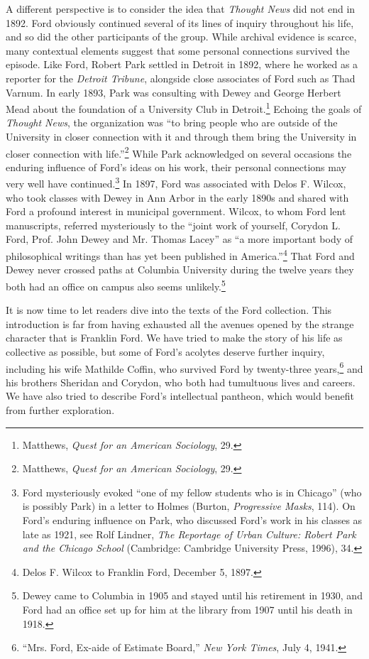 \documentclass[twoside,symmetric,nobib,justified]{tufte-book}
\begin{document}
\enlargethispage{\baselineskip}

A different perspective is to consider the idea that \emph{Thought News}
did not end in 1892. Ford obviously continued several of its lines of
inquiry throughout his life, and so did the other participants of the
group. While archival evidence is scarce, many contextual elements
suggest that some personal connections survived the episode. Like Ford,
Robert Park settled in Detroit in 1892, where he worked as a reporter
for the \emph{Detroit Tribune}, alongside close associates of Ford such
as Thad Varnum. In early 1893, Park was consulting with Dewey and George
Herbert Mead about the foundation of a University Club in
Detroit.\footnote{Matthews, \emph{Quest for an American Sociology}, 29.}
Echoing the goals of \emph{Thought News}, the organization was ``to
bring people who are outside of the University in closer connection with
it and through them bring the University in closer connection with
life.''\footnote{Matthews, \emph{Quest for an American Sociology}, 29.}
While Park acknowledged on several occasions the enduring influence of
Ford's ideas on his work, their personal connections may very well have
continued.\footnote{Ford mysteriously evoked ``one of my fellow students
  who is in Chicago'' (who is possibly Park) in a letter to Holmes
  (Burton, \emph{Progressive Masks}, 114). On Ford's enduring influence
  on Park, who discussed Ford's work in his classes as late as 1921, see
  Rolf Lindner, \emph{The Reportage of Urban Culture: Robert Park and
  the Chicago School} (Cambridge: Cambridge University Press, 1996), 34.}
In 1897, Ford was associated with Delos F. Wilcox, who took classes with
Dewey in Ann Arbor in the early 1890s and shared with Ford a profound
interest in municipal government. Wilcox, to whom Ford lent manuscripts,
referred mysteriously to the ``joint work of yourself, Corydon L. Ford,
Prof. John Dewey and Mr. Thomas Lacey'' as ``a more important body of
philosophical writings than has yet been published in
America.''\footnote{Delos F. Wilcox to Franklin Ford, December 5, 1897.}
That Ford and Dewey never crossed paths at Columbia University during
the twelve years they both had an office on campus also seems
unlikely.\footnote{Dewey came to Columbia in 1905 and stayed until his
  retirement in 1930, and Ford had an office set up for him at the
  library from 1907 until his death in 1918.}

It is now time to let readers dive into the texts of the Ford
collection. This introduction is far from having exhausted all the
avenues opened by the strange character that is Franklin Ford. We have
tried to make the story of his life as collective as possible, but some
of Ford's acolytes deserve further inquiry, including his wife Mathilde
Coffin, who survived Ford by twenty-three years,\footnote{``Mrs. Ford,
  Ex-aide of Estimate Board,'' \emph{New York Times}, July 4, 1941.} and
his brothers Sheridan and Corydon, who both had tumultuous lives and
careers. We have also tried to describe Ford's intellectual pantheon,
which would benefit from further exploration.
\end{document}
